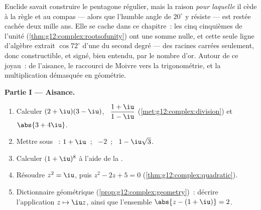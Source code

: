 \begin{problem}
\label{pb:g12:complex:1}
Euclide savait construire le pentagone régulier, mais la raison
\emph{pour laquelle} il cède à la règle et au compas --- alors que
l'humble angle de $20^\circ$ y résiste --- est restée cachée deux
mille ans. Elle se cache dans ce chapitre~: les cinq 
cinquièmes de l'unité (\cref{thm:g12:complex:rootsofunity}) ont une
somme nulle, et cette seule ligne d'algèbre extrait $\cos 72^\circ$
d'une  du second degré --- des racines carrées seulement,
donc constructible, et signé, bien entendu, par le nombre d'or.
Autour de ce joyau~: de l'aisance, le raccourci de Moivre vers la
trigonométrie, et la multiplication démasquée en géométrie.

\medskip
\noindent\textbf{Partie I --- Aisance.}
\begin{enumerate}
  \item Calculer $(2 + \iu)(3 - \iu)$, \
        $\dfrac{1 + \iu}{1 - \iu}$
        (\cref{met:g12:complex:division}) et $\abs{3 + 4\iu}$.
  \item Mettre sous ~: $1 + \iu$~; \ $-2$~; \
        $1 - \iu\sqrt3$.
  \item Calculer $(1 + \iu)^8$ à l'aide de la \omterm{def:g12:complex:argument}{forme
        exponentielle}.
  \item Résoudre $z^2 = \iu$, puis $z^2 - 2z + 5 = 0$
        (\cref{thm:g12:complex:quadratic}).
  \item Dictionnaire géométrique
        (\cref{prop:g12:complex:geometry})~: décrire
        l'application $z \mapsto \iu z$, ainsi que l'ensemble
        $\abs{z - (1 + \iu)} = 2$.
\end{enumerate}


\end{problem}
